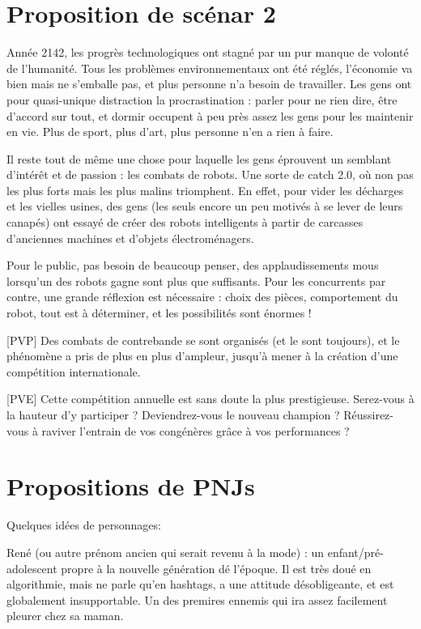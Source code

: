 \documentclass[10pt]{article}
\begin{document}
\section*{Proposition de scénar 2}

Année 2142, les progrès technologiques ont stagné par un pur manque de volonté de l'humanité. Tous les problèmes environnementaux ont été réglés, l'économie va bien mais ne s'emballe pas, et plus personne n'a besoin de travailler.
Les gens ont pour quasi-unique distraction la procrastination : parler pour ne rien dire, être d'accord sur tout, et dormir occupent à peu près assez les gens pour les maintenir en vie. Plus de sport, plus d'art, plus personne n'en a rien à faire.

Il reste tout de même une chose pour laquelle les gens éprouvent un semblant d'intérêt et de passion : les combats de robots. Une sorte de catch 2.0, où non pas les plus forts mais les plus malins triomphent.
En effet, pour vider les décharges et les vielles usines, des gens (les seuls encore un peu motivés à se lever de leurs canapés) ont essayé de créer des robots intelligents à partir de carcasses d'anciennes machines et d'objets électroménagers.

Pour le public, pas besoin de beaucoup penser, des applaudissements mous lorsqu'un des robots gagne sont plus que suffisants. Pour les concurrents par contre, une grande réflexion est nécessaire : choix des pièces, comportement du robot, tout est à déterminer, et les possibilités sont énormes !

[PVP]
Des combats de contrebande se sont organisés (et le sont toujours), et le phénomène a pris de plus en plus d'ampleur, jusqu'à mener à la création d'une compétition internationale.

[PVE]
Cette compétition annuelle est sans doute la plus prestigieuse. Serez-vous à la hauteur d'y participer ? Deviendrez-vous le nouveau champion ? Réussirez-vous à raviver l'entrain de vos congénères grâce à vos performances ?

\newpage
\section*{Propositions de PNJs}
Quelques idées de personnages:

René (ou autre prénom ancien qui serait revenu à la mode) : un enfant/pré-adolescent propre à la nouvelle génération dé l'époque. 
Il est très doué en algorithmie, mais ne parle qu'en hashtags, a une attitude désobligeante, et est globalement insupportable. Un des premires ennemis qui ira assez facilement pleurer chez sa maman.
\end{document}
